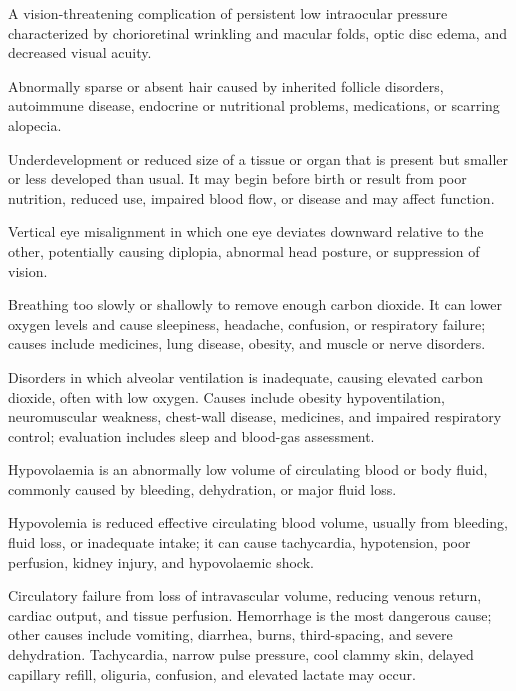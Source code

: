  A vision-threatening complication of persistent low intraocular pressure characterized by chorioretinal wrinkling and macular folds, optic disc edema, and decreased visual acuity.

 Abnormally sparse or absent hair caused by inherited follicle disorders, autoimmune disease, endocrine or nutritional problems, medications, or scarring alopecia.

 Underdevelopment or reduced size of a tissue or organ that is present but smaller or less developed than usual. It may begin before birth or result from poor nutrition, reduced use, impaired blood flow, or disease and may affect function.

 Vertical eye misalignment in which one eye deviates downward relative to the other, potentially causing diplopia, abnormal head posture, or suppression of vision.

 Breathing too slowly or shallowly to remove enough carbon dioxide. It can lower oxygen levels and cause sleepiness, headache, confusion, or respiratory failure; causes include medicines, lung disease, obesity, and muscle or nerve disorders.

 Disorders in which alveolar ventilation is inadequate, causing elevated carbon dioxide, often with low oxygen. Causes include obesity hypoventilation, neuromuscular weakness, chest-wall disease, medicines, and impaired respiratory control; evaluation includes sleep and blood-gas assessment.

 Hypovolaemia is an abnormally low volume of circulating blood or body fluid, commonly caused by bleeding, dehydration, or major fluid loss.

 Hypovolemia is reduced effective circulating blood volume, usually from bleeding, fluid loss, or inadequate intake; it can cause tachycardia, hypotension, poor perfusion, kidney injury, and hypovolaemic shock.

 Circulatory failure from loss of intravascular volume, reducing venous return, cardiac output, and tissue perfusion. Hemorrhage is the most dangerous cause; other causes include vomiting, diarrhea, burns, third-spacing, and severe dehydration. Tachycardia, narrow pulse pressure, cool clammy skin, delayed capillary refill, oliguria, confusion, and elevated lactate may occur.

